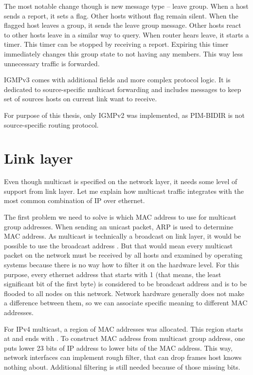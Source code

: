 The most notable change though is new message type -- leave group. When a host
sends a report, it sets a flag. Other hosts without flag remain silent. When
the flagged host leaves a group, it sends the leave group message. Other hosts
react to other hosts leave in a similar way to query. When router hears leave,
it starts a timer. This timer can be stopped by receiving a report. Expiring this
timer immediately changes this group state to not having any members. This way
less unnecessary traffic is forwarded.

IGMPv3 comes with additional fields and more complex protocol logic. It is
dedicated to source-specific multicast forwarding and includes messages to keep
set of sources hosts on current link want to receive.

For purpose of this thesis, only IGMPv2 was implemented, as PIM-BIDIR is not
source-specific routing protocol.

\section{Link layer}

Even though multicast is specified on the network layer, it needs some level of
support from link layer. Let me explain how multicast traffic integrates with
the most common combination of IP over ethernet.

The first problem we need to solve is which MAC address to use for multicast group
addresses. When sending an unicast packet, ARP is used to determine MAC address.
As multicast is technically a broadcast on link layer, it would be possible to
use the broadcast address .
But that would mean every multicast packet on the network must be received by all
hosts and examined by operating systems because there is no way how to filter
it on the hardware level. For this purpose, every ethernet address that starts with
1 (that means, the least significant bit of the first byte) is considered to be
broadcast address and is to be flooded to all nodes on this network. Network
hardware generally does not make a difference between them, so we can associate
specific meaning to different MAC addresses.

For IPv4 multicast, a region of MAC addresses was allocated. This region starts
at  and ends with . To construct
MAC address from multicast group address, one puts lower 23 bits of IP address
to lower bits of the MAC address. This way, network interfaces can implement
rough filter, that can drop frames host knows nothing about. Additional
filtering is still needed because of those missing bits.

